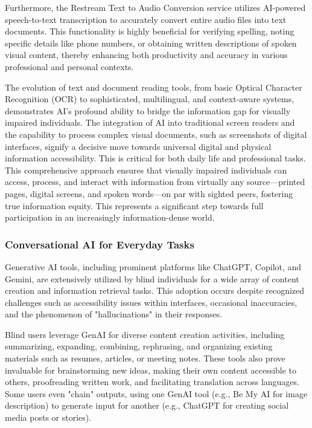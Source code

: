 Furthermore, the Restream Text to Audio Conversion service utilizes AI-powered speech-to-text transcription to accurately convert entire audio files into text documents. This functionality is highly beneficial for verifying spelling, noting specific details like phone numbers, or obtaining written descriptions of spoken visual content, thereby enhancing both productivity and accuracy in various professional and personal contexts. \cite{accessiblepharmacy2024}

The evolution of text and document reading tools, from basic Optical Character Recognition (OCR) to sophisticated, multilingual, and context-aware systems, demonstrates AI's profound ability to bridge the information gap for visually impaired individuals. The integration of AI into traditional screen readers and the capability to process complex visual documents, such as screenshots of digital interfaces, signify a decisive move towards universal digital and physical information accessibility. This is critical for both daily life and professional tasks. This comprehensive approach ensures that visually impaired individuals can access, process, and interact with information from virtually any source—printed pages, digital screens, and spoken words—on par with sighted peers, fostering true information equity. This represents a significant step towards full participation in an increasingly information-dense world.

\subsubsection{Conversational AI for Everyday Tasks}

Generative AI tools, including prominent platforms like ChatGPT, Copilot, and Gemini, are extensively utilized by blind individuals for a wide array of content creation and information retrieval tasks. This adoption occurs despite recognized challenges such as accessibility issues within interfaces, occasional inaccuracies, and the phenomenon of "hallucinations" in their responses. \cite{maitraye2024}

Blind users leverage GenAI for diverse content creation activities, including summarizing, expanding, combining, rephrasing, and organizing existing materials such as resumes, articles, or meeting notes. These tools also prove invaluable for brainstorming new ideas, making their own content accessible to others, proofreading written work, and facilitating translation across languages. Some users even "chain" outputs, using one GenAI tool (e.g., Be My AI for image description) to generate input for another (e.g., ChatGPT for creating social media posts or stories). \cite{maitraye2024}

